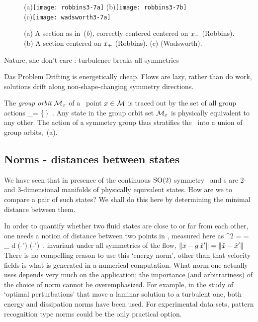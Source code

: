 \begin{figure}
   \centering
(a)\texttt{[image: robbins3-7a]}
(b)\texttt{[image: robbins3-7b]}
\\
(c)\texttt{[image: wadsworth3-7a]}
   \caption{\label{fig:robbins3-7}
    (a)
A section as in \,({\it b}), correctly centered
centered on $x_{-}$ (Robbins).
    (b)
A section centered on $x_{+}$ (Robbins).
    (c)
(Wadsworth).
}
\end{figure}

Nature, she don't care :
turbulence breaks all symmetries

{\Large Das Problem}
Drifting is energetically cheap.
Flows are lazy, rather than do work, solutions drift along non-shape-changing
symmetry directions.

    \color{black}\fi

The \emph{group orbit} ${\cal M}_{x} $ of a \statesp\ point $x \in {\cal M}$ is
traced out by the set of all group actions
\beq
\pS_\ssp = \{\LieEl\,\ssp \mid \LieEl \in {\Group}\}
\,.
Any state in the  group orbit set ${\cal M}_{x}$
is physically equivalent to any other. The action of a symmetry group
thus stratifies the \statesp\ into a union of group orbits,
\,{(a)}.

\subsection{Norms - distances between states}

We have seen that in presence of the continuous $\textrm{SO}(2)$ symmetry
\reqva\ and \rpo s are 2- and 3-dimensional manifolds of physically
equivalent states. How are we to compare a pair of such states? We shall
do this here by determining the minimal distance between them.

In order to quantify
whether two fluid states are close to or far from each other, one
needs a notion of distance between two points in \statesp, measured
here as
\beq
  ^2  =  =
\int_\bCell \! d \bx \;
(-') \cdot (-')
\,,
invariant under all symmetries of the flow,
$\|{x-g\,{\hat{x}'}}\|=\|{\hat{x}-{\hat{x}'}}\|$
There is no compelling reason to use this {`energy norm'}, other than
that velocity fields is what is generated in a numerical
computation. What norm one actually uses depends very much on the
application; the importance (and arbitrariness) of the choice of
norm cannot be overemphasized. For example, in the study of `optimal perturbations' that
move a laminar solution to a turbulent one, both energy
\citep{TeHaHe10} and dissipation \citep{LoCaCoPeGo11} norms have been
used.
For experimental data sets, pattern recognition type norms could be the
only practical option.


